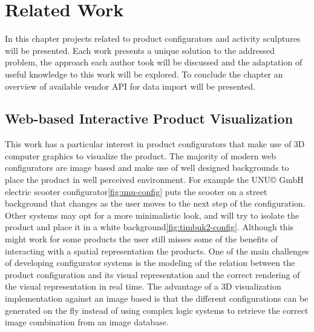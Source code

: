 \documentclass[Medieninformatik-arbeit.tex]{subfiles}
\begin{document}
\label{ch:related}
\section{Related Work}
In this chapter projects related to product configurators and activity
sculptures will be presented. Each work presents a unique solution to the addressed problem, 
the approach each author took will be discussed and the adaptation of useful knowledge to this
work will be explored. To conclude the chapter an overview of available vendor
API for data import will be presented. 

\subsection{Web-based Interactive Product Visualization}
This work has a particular interest in product configurators that make use of 3D
computer graphics to visualize the product. The majority of modern web
configurators are image based and make use of well designed backgrounds to place the
product in well perceived environment. For example the UNU\copyright{} GmbH electric scooter
configurator\ref{fig:unu-config} puts the scooter on a street background that
changes as the user moves to the next step of the configuration. Other
systems may opt for a more minimalistic look, and will try to isolate the product and place it
in a white background\ref{fig:timbuk2-config}. Although this
might work for some products the user still misses some of the benefits of
interacting with a spatial representation the products\cite{vande2009analyzing}.
One of the main challenges of developing  configurator systems is the modeling
of the relation between the product configuration and its visual representation
and the correct rendering of the visual representation in real
time\cite{feliceinteractive}. The advantage of a 3D visualization implementation
against an image based is that the different configurations can be generated on
the fly instead of using complex logic systems to retrieve the correct image
combination from an image database.  
\end{document}

